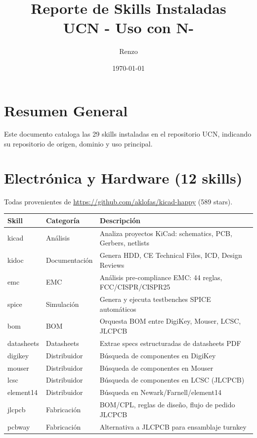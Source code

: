 ﻿\documentclass[11pt,a4paper]{article}
\title{\textbf{Reporte de Skills Instaladas}\\UCN - Uso con N-}
\author{Renzo}
\date{\today}
\begin{document}
\maketitle
\tableofcontents
\newpage

\section{Resumen General}

Este documento cataloga las 29 skills instaladas en el repositorio UCN, indicando su repositorio de origen, dominio y uso principal.

\section{Electrónica y Hardware (12 skills)}

Todas provenientes de \url{https://github.com/aklofas/kicad-happy} (589 stars).

\begin{longtable}{llp{6cm}}
\toprule
\textbf{Skill} & \textbf{Categoría} & \textbf{Descripción} \\
\midrule
\endhead
kicad & Análisis & Analiza proyectos KiCad: schematics, PCB, Gerbers, netlists \\
kidoc & Documentación & Genera HDD, CE Technical Files, ICD, Design Reviews \\
emc & EMC & Análisis pre-compliance EMC: 44 reglas, FCC/CISPR/CISPR25 \\
spice & Simulación & Genera y ejecuta testbenches SPICE automáticos \\
bom & BOM & Orquesta BOM entre DigiKey, Mouser, LCSC, JLCPCB \\
datasheets & Datasheets & Extrae specs estructuradas de datasheets PDF \\
digikey & Distribuidor & Búsqueda de componentes en DigiKey \\
mouser & Distribuidor & Búsqueda de componentes en Mouser \\
lcsc & Distribuidor & Búsqueda de componentes en LCSC (JLCPCB) \\
element14 & Distribuidor & Búsqueda en Newark/Farnell/element14 \\
jlcpcb & Fabricación & BOM/CPL, reglas de diseño, flujo de pedido JLCPCB \\
pcbway & Fabricación & Alternativa a JLCPCB para ensamblaje turnkey \\
\bottomrule
\end{longtable}
\end{document}
